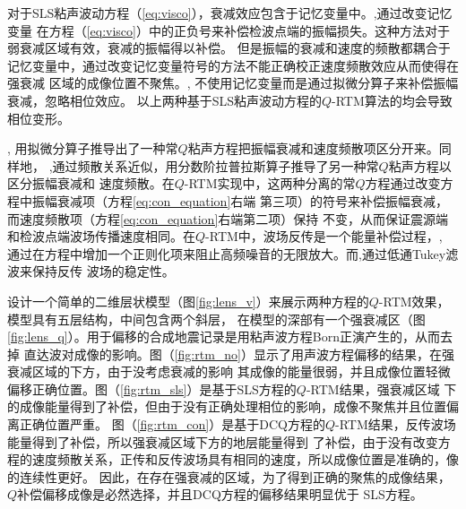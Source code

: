 对于SLS粘声波动方程（\ref{eq:visco}），衰减效应包含于记忆变量中。,通过改变记忆变量
在方程（\ref{eq:visco}）中的正负号来补偿检波点端的振幅损失。这种方法对于弱衰减区域有效，衰减的振幅得以补偿。
但是振幅的衰减和速度的频散都耦合于记忆变量中，通过改变记忆变量符号的方法不能正确校正速度频散效应从而使得在强衰减
区域的成像位置不聚焦。, 不使用记忆变量而是通过拟微分算子来补偿振幅衰减，忽略相位效应。
以上两种基于SLS粘声波动方程的$Q$-RTM算法的均会导致相位变形。

, 用拟微分算子推导出了一种常$Q$粘声方程把振幅衰减和速度频散项区分开来。同样地，
,通过频散关系近似，用分数阶拉普拉斯算子推导了另一种常$Q$粘声方程以区分振幅衰减和
速度频散。在$Q$-RTM实现中，这两种分离的常$Q$方程通过改变方程中振幅衰减项（方程\ref{eq:con_equation}右端
第三项）的符号来补偿振幅衰减，而速度频散项（方程\ref{eq:con_equation}右端第二项）保持
不变，从而保证震源端和检波点端波场传播速度相同。在$Q$-RTM中，波场反传是一个能量补偿过程，,
通过在方程中增加一个正则化项来阻止高频噪音的无限放大。而,通过低通Tukey滤波来保持反传
波场的稳定性。

设计一个简单的二维层状模型（图\ref{fig:lens_v}）来展示两种方程的$Q$-RTM效果，模型具有五层结构，中间包含两个斜层，
在模型的深部有一个强衰减区（图\ref{fig:lens_q}）。用于偏移的合成地震记录是用粘声波方程Born正演产生的，从而去掉
直达波对成像的影响。图（\ref{fig:rtm_no}）显示了用声波方程偏移的结果，在强衰减区域的下方，由于没考虑衰减的影响
其成像的能量很弱，并且成像位置轻微偏移正确位置。图（\ref{fig:rtm_sls}）是基于SLS方程的$Q$-RTM结果，强衰减区域
下的成像能量得到了补偿，但由于没有正确处理相位的影响，成像不聚焦并且位置偏离正确位置严重。
图（\ref{fig:rtm_con}）是基于DCQ方程的$Q$-RTM结果，反传波场能量得到了补偿，所以强衰减区域下方的地层能量得到
了补偿，由于没有改变方程的速度频散关系，正传和反传波场具有相同的速度，所以成像位置是准确的，像的连续性更好。
因此，在存在强衰减的区域，为了得到正确的聚焦的成像结果，$Q$补偿偏移成像是必然选择，并且DCQ方程的偏移结果明显优于
SLS方程。

